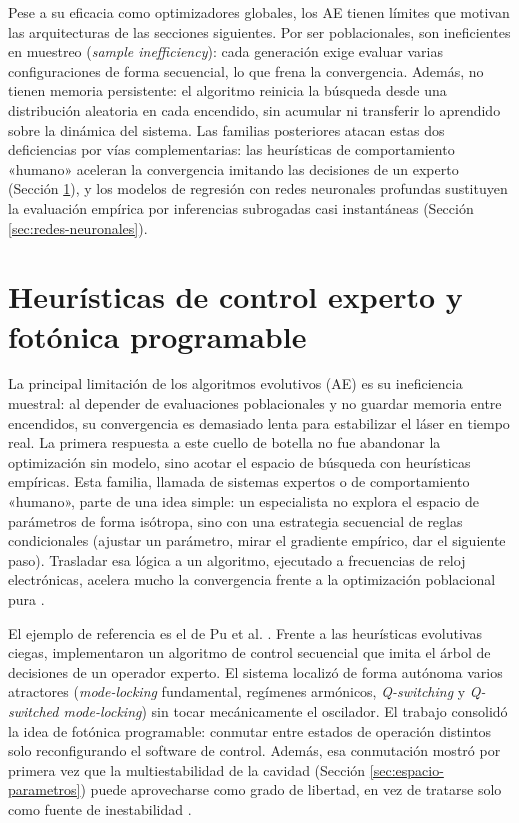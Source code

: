 Pese a su eficacia como optimizadores globales, los AE tienen límites que motivan las arquitecturas de las secciones siguientes. Por ser poblacionales, son ineficientes en muestreo (\emph{sample inefficiency}): cada generación exige evaluar varias configuraciones de forma secuencial, lo que frena la convergencia. Además, no tienen memoria persistente: el algoritmo reinicia la búsqueda desde una distribución aleatoria en cada encendido, sin acumular ni transferir lo aprendido sobre la dinámica del sistema. Las familias posteriores atacan estas dos deficiencias por vías complementarias: las heurísticas de comportamiento «humano» aceleran la convergencia imitando las decisiones de un experto (Sección \ref{sec:algoritmos-humanos}), y los modelos de regresión con redes neuronales profundas sustituyen la evaluación empírica por inferencias subrogadas casi instantáneas (Sección \ref{sec:redes-neuronales}).


\section{Heurísticas de control experto y fotónica programable}
\label{sec:algoritmos-humanos}

La principal limitación de los algoritmos evolutivos (AE) es su ineficiencia muestral: al depender de evaluaciones poblacionales y no guardar memoria entre encendidos, su convergencia es demasiado lenta para estabilizar el láser en tiempo real. La primera respuesta a este cuello de botella no fue abandonar la optimización sin modelo, sino acotar el espacio de búsqueda con heurísticas empíricas. Esta familia, llamada de sistemas expertos o de comportamiento «humano», parte de una idea simple: un especialista no explora el espacio de parámetros de forma isótropa, sino con una estrategia secuencial de reglas condicionales (ajustar un parámetro, mirar el gradiente empírico, dar el siguiente paso). Trasladar esa lógica a un algoritmo, ejecutado a frecuencias de reloj electrónicas, acelera mucho la convergencia frente a la optimización poblacional pura \cite{Pu2019}.

El ejemplo de referencia es el de Pu et al. \cite{Pu2019}. Frente a las heurísticas evolutivas ciegas, implementaron un algoritmo de control secuencial que imita el árbol de decisiones de un operador experto. El sistema localizó de forma autónoma varios atractores (\emph{mode-locking} fundamental, regímenes armónicos, \emph{Q-switching} y \emph{Q-switched mode-locking}) sin tocar mecánicamente el oscilador. El trabajo consolidó la idea de fotónica programable: conmutar entre estados de operación distintos solo reconfigurando el software de control. Además, esa conmutación mostró por primera vez que la multiestabilidad de la cavidad (Sección \ref{sec:espacio-parametros}) puede aprovecharse como grado de libertad, en vez de tratarse solo como fuente de inestabilidad \cite{Genty2021}.

